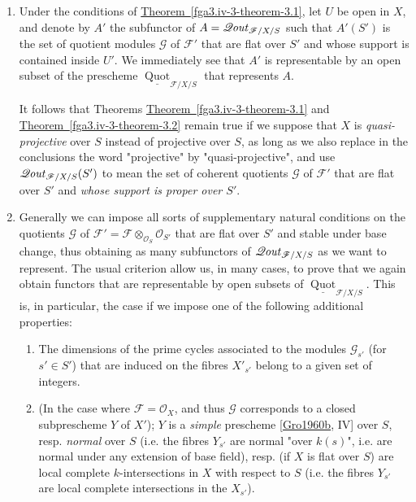 \begin{enumerate}
  
 \item[a.]
    \par{}Under the conditions of \hyperref[fga3.iv-3-theorem-3.1]{Theorem~\ref*{fga3.iv-3-theorem-3.1}}, let \(U\) be open in \(X\), and denote by \(A'\) the subfunctor of \(A=\mathscr {Q}\kern  -.75pt\mathit {out}_{{\mathscr {F}/X/S}}\) such that \(A'(S')\) is the set of quotient modules \(\mathscr {G}\) of \(\mathscr {F}'\) that are flat over \(S'\) and whose support is contained inside \(U'\).
      We immediately see that \(A'\) is representable by an open subset of the prescheme \(\underline {\operatorname {Quot}}_{{\mathscr {F}/X/S}}\) that represents \(A\).
      
      It follows that Theorems \hyperref[fga3.iv-3-theorem-3.1]{Theorem~\ref*{fga3.iv-3-theorem-3.1}} and \hyperref[fga3.iv-3-theorem-3.2]{Theorem~\ref*{fga3.iv-3-theorem-3.2}} remain true if we suppose that \(X\) is \emph{quasi-projective} over \(S\) instead of projective over \(S\), as long as we also replace in the conclusions the word "projective" by "quasi-projective", and use \(\mathscr {Q}\kern  -.75pt\mathit {out}_{{\mathscr {F}/X/S}}(S')\) to mean the set of coherent quotients \(\mathscr {G}\) of \(\mathscr {F}'\) that are flat over \(S'\) and \emph{whose support is proper over \(S'\)}.
  


  
 \item[b.]
    \par{}Generally we can impose all sorts of supplementary natural conditions on the quotients \(\mathscr {G}\) of \(\mathscr {F}'=\mathscr {F}\otimes _{\mathcal {O}_S}\mathcal {O}_{S'}\) that are flat over \(S'\) and stable under base change, thus obtaining as many subfunctors of \(\mathscr {Q}\kern  -.75pt\mathit {out}_{{\mathscr {F}/X/S}}\) as we want to represent.
      The usual criterion allow us, in many cases, to prove that we again obtain functors that are representable by open subsets of \(\underline {\operatorname {Quot}}_{{\mathscr {F}/X/S}}\).
      This is, in particular, the case if we impose one of the following additional properties:

      \begin{enumerate}\item{}The dimensions of the prime cycles associated to the modules \(\mathscr {G}_{s'}\) (for \(s'\in  S'\)) that are induced on the fibres \(X'_{s'}\) belong to a given set of integers.
        \item{}(In the case where \(\mathscr {F}=\mathcal {O}_X\), and thus \(\mathscr {G}\) corresponds to a closed subprescheme \(Y\) of \(X'\)); \(Y\) is a \emph{simple} prescheme [\hyperref[Gro1960b]{Gro1960b}, IV] over \(S\), resp. \emph{normal} over \(S\) (i.e. the fibres \(Y_{s'}\) are normal "over \(k(s)\)", i.e. are normal under any extension of base field), resp. (if \(X\) is flat over \(S\)) are local complete \(k\)-intersections in \(X\) with respect to \(S\) (i.e. the fibres \(Y_{s'}\) are local complete intersections in the \(X_{s'}\)).\end{enumerate}


\end{enumerate}
